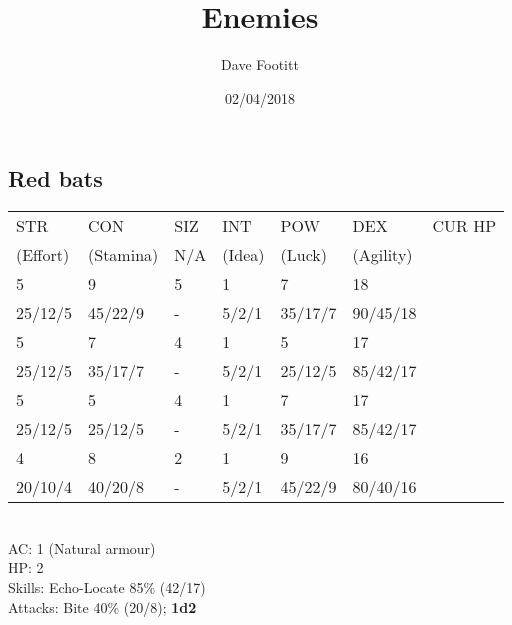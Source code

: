 \documentclass[12pt,a4paper]{article}
\author{Dave Footitt}
\title{Enemies}
\date{02/04/2018}
\begin{document}
\subsection*{Red bats}
\begin{tabular}{| l | l | l | l | l | l |l|}
\hline
STR & CON & SIZ & INT & POW & DEX & CUR HP\\
(Effort) & (Stamina) & N/A & (Idea) & (Luck) & (Agility) & \\
\hline

5       & 9       & 5 & 1     & 7       & 18       & \\
25/12/5 & 45/22/9 & - & 5/2/1 & 35/17/7 & 90/45/18 & \\ 

\rowcolor{lightgray}
5       & 7       & 4 & 1     & 5       & 17       & \\
\rowcolor{lightgray}
25/12/5 & 35/17/7 & - & 5/2/1 & 25/12/5 & 85/42/17 & \\ 

5       & 5       & 4 & 1     & 7       & 17       & \\
25/12/5 & 25/12/5 & - & 5/2/1 & 35/17/7 & 85/42/17 & \\

\rowcolor{lightgray}
4       & 8       & 2 & 1     & 9       & 16       & \\
\rowcolor{lightgray}
20/10/4 & 40/20/8 & - & 5/2/1 & 45/22/9 & 80/40/16 & \\

\hline
\end{tabular}
\vspace{0.2cm}
\\
AC: 1 (Natural armour)\\
HP: 2\\
Skills: Echo-Locate 85\% (42/17)\\
Attacks: Bite 40\% (20/8); \textbf{1d2}
\end{document}

